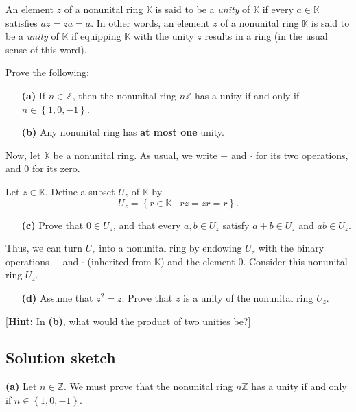 \documentclass[paper=a4, fontsize=12pt]{scrartcl}%
\theoremstyle{plainsl}
\theoremstyle{definition}
\theoremstyle{remark}
\begin{document}
An element $z$ of a nonunital ring $\mathbb{K}$ is said to be a \textit{unity}
of $\mathbb{K}$ if every $a \in\mathbb{K}$ satisfies $az = za = a$. In other
words, an element $z$ of a nonunital ring $\mathbb{K}$ is said to be a
\textit{unity} of $\mathbb{K}$ if equipping $\mathbb{K}$ with the unity $z$
results in a ring (in the usual sense of this word).

Prove the following:

\begin{enumerate}
\item[\textbf{(a)}] If $n \in\mathbb{Z}$, then the nonunital ring $n
\mathbb{Z}$ has a unity if and only if $n \in\left\{  1, 0, -1 \right\}  $.

\item[\textbf{(b)}] Any nonunital ring has \textbf{at most one} unity.
\end{enumerate}

Now, let $\mathbb{K}$ be a nonunital ring. As usual, we write $+$ and $\cdot$
for its two operations, and $0$ for its zero.

Let $z \in\mathbb{K}$. Define a subset $U_{z}$ of $\mathbb{K}$ by
\[
U_{z} = \left\{  r \in\mathbb{K} \mid rz = zr = r \right\}  .
\]


\begin{enumerate}
\item[\textbf{(c)}] Prove that $0 \in U_{z}$, and that every $a, b \in U_{z}$
satisfy $a + b \in U_{z}$ and $ab \in U_{z}$.
\end{enumerate}

Thus, we can turn $U_{z}$ into a nonunital ring by endowing $U_{z}$ with the
binary operations $+$ and $\cdot$ (inherited from $\mathbb{K}$) and the
element $0$. Consider this nonunital ring $U_{z}$.

\begin{enumerate}
\item[\textbf{(d)}] Assume that $z^{2} = z$. Prove that $z$ is a unity of the
nonunital ring $U_{z}$.
\end{enumerate}

[\textbf{Hint:} In \textbf{(b)}, what would the product of two unities be?]

\subsection{Solution sketch}

\textbf{(a)} Let $n\in\mathbb{Z}$. We must prove that the nonunital ring
$n\mathbb{Z}$ has a unity if and only if $n\in\left\{  1,0,-1\right\}  $.
\end{document}
